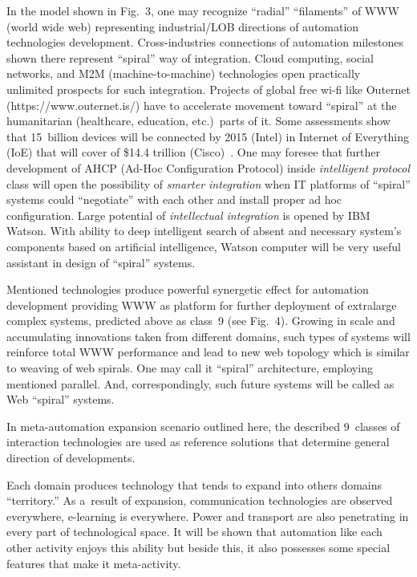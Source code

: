 \begin{multicols}{2}
 In the model shown in Fig.~3, one may recognize ``radial'' ``filaments'' of WWW
 (world wide web) representing
industrial/LOB directions of automation technologies development. Cross-industries connections of
automation milestones shown there represent ``spiral'' way of integration. Cloud computing,
social networks, and M2M (machine-to-machine) technologies open practically unlimited prospects for such
integration. Projects of global free wi-fi like Outernet ({\sf https://www.outernet.is/}) have to accelerate
movement toward ``spiral'' at the humanitarian (healthcare, education, etc.)\ parts of it.
Some assessments
show that 15~billion devices will be connected by 2015 (Intel) in Internet of Everything (IoE) that will
cover of \$14.4 trillion (Cisco)~\cite{10-sor}. One
may foresee that further development of AHCP (Ad-Hoc
Configuration Protocol) inside \textit{intelligent protocol} class will open the possibility of \textit{smarter
integration} when IT platforms of ``spiral'' systems could ``negotiate'' with each other and install proper ad
hoc configuration. Large potential of \textit{intellectual integration} is opened by IBM Watson. With
ability to deep intelligent search of absent and necessary system's components based on artificial
intelligence, Watson computer will be very useful assistant in design of ``spiral'' systems.

 Mentioned technologies  produce powerful synergetic effect for automation development providing
WWW as platform for further deployment of extralarge complex systems, predicted above as class~9
(see Fig.~4). Growing in scale and accumulating innovations taken from different
domains, such types of
systems will reinforce total WWW performance and lead to new web topology which is similar to weaving
of web spirals. One may call it ``spiral'' architecture, employing mentioned parallel.
And, correspondingly, such future systems will be called as Web ``spiral'' systems.

In meta-automation expansion scenario outlined here, the described 9~classes of interaction
technologies are used
as reference solutions that determine general direction of developments.	

 Each domain produces technology that tends to expand into others domains ``territory.'' As a~result of
expansion, communication technologies are observed
everywhere, e-learning is everywhere. Power
and transport are also penetrating in every part of technological space.
It will be shown that automation like
each other activity enjoys this ability but beside this, it also possesses
some special features that make it meta-activity.


\end{multicols}
